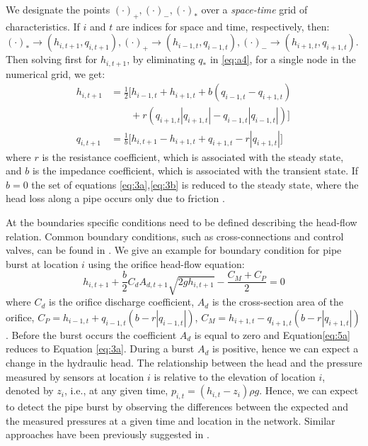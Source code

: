 \documentclass[twocolumn]{autart}
\begin{document}
We designate the points $(\cdot)_+,(\cdot)_-,(\cdot)_*$ over a \textit{space-time} grid of characteristics. If $i$ and $t$ are indices for space and time, respectively, then: $(\cdot)_* \rightarrow (h_{i,t+1},q_{i,t+1}),(\cdot)_+ \rightarrow (h_{i-1,t},q_{i-1,t}),(\cdot)_- \rightarrow (h_{i+1,t},q_{i+1,t})$. Then solving first for $h_{i,t+1}$, by eliminating $q_*$ in \eqref{eq:a4}, for a single node in the numerical grid, we get:
\begin{align} 
 h_{i,t+1} &= \frac{1}{2} \big[ h_{i-1,t} + h_{i+1,t} + b \left( q_{i-1,t} - q_{i+1,t} \right) \nonumber \\
 &\qquad {} + r \left( q_{i+1,t} |q_{i+1,t}| - q_{i-1,t} |q_{i-1,t}| \right) \big] \label{eq:3a}\\
q_{i,t+1} &= \frac{1}{b} \big[ h_{i,t+1} -h_{i+1,t} + q_{i+1,t} - r |q_{i+1,t}| \big]  \label{eq:3b}
\end{align} 
where $r$ is the resistance coefficient, which is associated with the steady state, and $b$ is the impedance coefficient, which is associated with the transient state. If $b = 0$ the set of equations \eqref{eq:3a},\eqref{eq:3b} is reduced to the steady state, where the head loss along a pipe occurs only due to friction \cite{todi}.

At the boundaries specific conditions need to be defined describing the head-flow relation. Common boundary conditions, such as cross-connections and control valves, can be found in \cite{wylie1993}. We give an example for boundary condition for pipe burst at location $i$ using the orifice head-flow equation:
\begin{equation} \label{eq:5a}
h_{i,t+1}  + \frac{b}{2}C_dA_{d,t+1} \sqrt{2gh_{i,t+1}}
- \frac{C_M +C_P }{2} = 0
\end{equation}
where $C_d$ is the orifice discharge coefficient, $A_{d}$ is the cross-section area of the orifice, $C_P = h_{i-1,t} + q_{i-1,t} \left ( b - r |q_{i-1,t}| \right ) $, $ C_M = h_{i+1,t} - q_{i+1,t} \left ( b - r |q_{i+1,t}| \right )$. Before the burst occurs the coefficient $A_d$ is equal to zero and Equation\eqref{eq:5a} reduces to Equation \eqref{eq:3a}. During a burst $A_d$ is positive, hence we can expect a change in the hydraulic head. The relationship between the head and the pressure measured by sensors at location $i$ is relative to the elevation of location $i$, denoted by $z_i$, i.e., at any given time, $p_{i,t} = \left( h_{i,t} - z_i \right)\rho g$.  
Hence, we can expect to detect the pipe burst by observing the differences between the expected and the measured pressures at a given time and location in the network. Similar approaches have been previously suggested in \cite{69012}.
\end{document}
